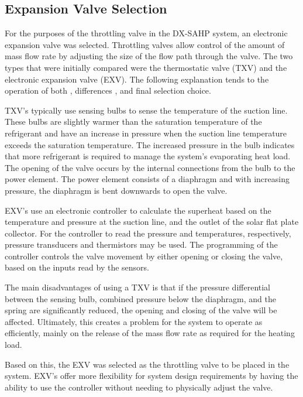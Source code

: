 \subsection{Expansion Valve Selection}

For the purposes of the throttling valve in the DX-SAHP system, an electronic expansion valve was selected. Throttling valves allow control of the amount of mass flow rate by adjusting the size of the flow path through the valve. The two types that were initially compared were the thermostatic valve (TXV) and the electronic expansion valve (EXV). The following explanation tends to the operation of both \cite{exv_txv}, differences \cite{txv}, and final selection choice.

\medskip
TXV’s typically use sensing bulbs to sense the temperature of the suction line. These bulbs are slightly warmer than the saturation temperature of the refrigerant and have an increase in pressure when the suction line temperature exceeds the saturation temperature. The increased pressure in the bulb indicates that more refrigerant is required to manage the system’s evaporating heat load. The opening of the valve occurs by the internal connections from the bulb to the power element. The power element consists of a diaphragm and with increasing pressure, the diaphragm is bent downwards to open the valve.

\medskip
EXV’s use an electronic controller to calculate the superheat based on the temperature and pressure at the suction line, and the outlet of the solar flat plate collector. For the controller to read the pressure and temperatures, respectively, pressure transducers and thermistors may be used. The programming of the controller controls the valve movement by either opening or closing the valve, based on the inputs read by the sensors.

\medskip
The main disadvantages of using a TXV is that if the pressure differential between the sensing bulb, combined pressure below the diaphragm, and the spring are significantly reduced, the opening and closing of the valve will be affected. Ultimately, this creates a problem for the system to operate as efficiently, mainly on the release of the mass flow rate as required for the heating load.

\medskip
Based on this, the EXV was selected as the throttling valve to be placed in the system. EXV’s offer more flexibility for system design requirements by having the ability to use the controller without needing to physically adjust the valve.
